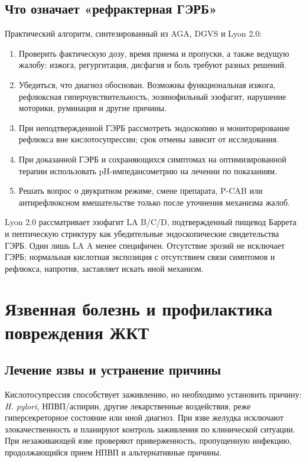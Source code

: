 \documentclass[11pt,a4paper,notitlepage]{report}
\newcommand{\Hp}{\textit{H. pylori}}
\newcommand{\src}[1]{\unskip\space\cite{#1}}
\begin{document}
\subsection{Что означает «рефрактерная ГЭРБ»}
\label{sec:refractory-gerd}
Практический алгоритм, синтезированный из AGA, DGVS и Lyon 2.0:\src{agagerd,dgvs,lyon}
\begin{enumerate}
\item Проверить фактическую дозу, время приема и пропуски, а также ведущую жалобу: изжога, регургитация, дисфагия и боль требуют разных решений.
\item Убедиться, что диагноз обоснован. Возможны функциональная изжога, рефлюксная гиперчувствительность, эозинофильный эзофагит, нарушение моторики, руминация и другие причины.
\item При неподтвержденной ГЭРБ рассмотреть эндоскопию и мониторирование рефлюкса вне кислотосупрессии; срок отмены зависит от исследования.
\item При доказанной ГЭРБ и сохраняющихся симптомах на оптимизированной терапии использовать pH-импедансометрию на лечении по показаниям.
\item Решать вопрос о двукратном режиме, смене препарата, P-CAB или антирефлюксном вмешательстве только после уточнения механизма жалоб.
\end{enumerate}

Lyon 2.0 рассматривает эзофагит LA B/C/D, подтвержденный пищевод Баррета и пептическую стриктуру как убедительные эндоскопические свидетельства ГЭРБ. Один лишь LA A менее специфичен. Отсутствие эрозий не исключает ГЭРБ; нормальная кислотная экспозиция с отсутствием связи симптомов и рефлюкса, напротив, заставляет искать иной механизм.\src{lyon}

\section{Язвенная болезнь и профилактика повреждения ЖКТ}
\label{sec:ulcer-disease}

\subsection{Лечение язвы и устранение причины}
Кислотосупрессия способствует заживлению, но необходимо установить причину: \Hp, НПВП/аспирин, другие лекарственные воздействия, реже гиперсекреторное состояние или иной диагноз. При язве желудка исключают злокачественность и планируют контроль заживления по клинической ситуации. При незаживающей язве проверяют приверженность, пропущенную инфекцию, продолжающийся прием НПВП и альтернативные причины.\src{nice}
\end{document}
